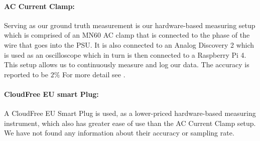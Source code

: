 \paragraph{AC Current Clamp:}
Serving as our ground truth measurement is our hardware-based measuring setup which is comprised of an MN60 AC clamp that is connected to the phase of the wire that goes into the PSU. It is also connected to an Analog Discovery 2 which is used as an oscilloscope which in turn is then connected to a Raspberry Pi 4. This setup allows us to continuously measure and log our data. The accuracy is reported to be $2\%$ For more detail see \cite{biksbois}.

\paragraph{CloudFree EU smart Plug:}
A CloudFree EU Smart Plug\cite{CloudFreeEUSMartPlug} is used, as a lower-priced hardware-based measuring instrument, which also has greater ease of use than the AC Current Clamp setup. We have not found any information about their accuracy or sampling rate.